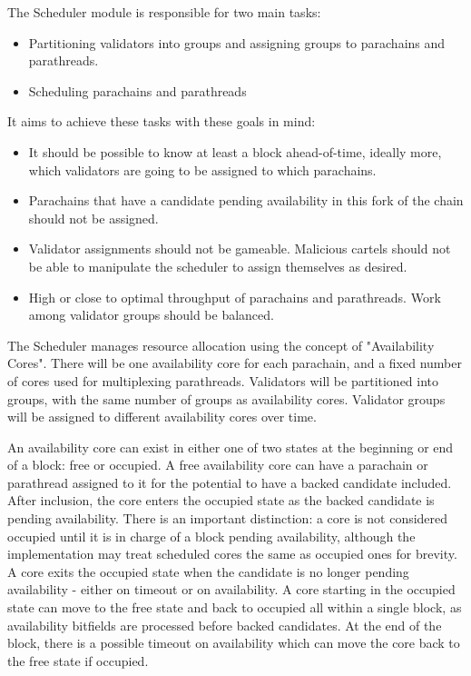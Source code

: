 \newline

The Scheduler module is responsible for two main tasks:

\begin{itemize}
    \item Partitioning validators into groups and assigning groups to parachains
    and parathreads.
    \item Scheduling parachains and parathreads
\end{itemize}

It aims to achieve these tasks with these goals in mind:

\begin{itemize}
    \item It should be possible to know at least a block ahead-of-time, ideally
    more, which validators are going to be assigned to which parachains.
    \item Parachains that have a candidate pending availability in this fork of
    the chain should not be assigned.
    \item Validator assignments should not be gameable. Malicious cartels should
    not be able to manipulate the scheduler to assign themselves as desired.
    \item High or close to optimal throughput of parachains and parathreads.
    Work among validator groups should be balanced.
\end{itemize}

The Scheduler manages resource allocation using the concept of "Availability
Cores". There will be one availability core for each parachain, and a fixed
number of cores used for multiplexing parathreads. Validators will be
partitioned into groups, with the same number of groups as availability cores.
Validator groups will be assigned to different availability cores over time.
\newline

An availability core can exist in either one of two states at the beginning or
end of a block: free or occupied. A free availability core can have a parachain
or parathread assigned to it for the potential to have a backed candidate
included. After inclusion, the core enters the occupied state as the backed
candidate is pending availability. There is an important distinction: a core is
not considered occupied until it is in charge of a block pending availability,
although the implementation may treat scheduled cores the same as occupied ones
for brevity. A core exits the occupied state when the candidate is no longer
pending availability - either on timeout or on availability. A core starting in
the occupied state can move to the free state and back to occupied all within a
single block, as availability bitfields are processed before backed candidates.
At the end of the block, there is a possible timeout on availability which can
move the core back to the free state if occupied.


